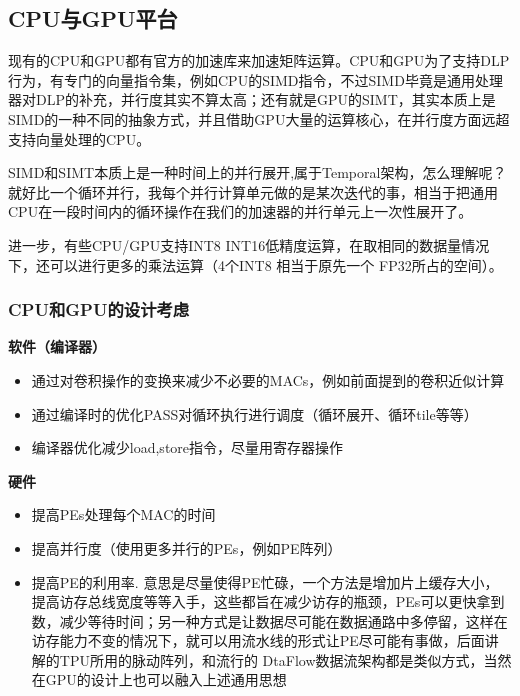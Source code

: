 \documentclass[12pt]{article}
\begin{document}
\subsection{CPU与GPU平台}
现有的CPU和GPU都有官方的加速库来加速矩阵运算。CPU和GPU为了支持DLP行为，有专门的向量指令集，例如CPU的SIMD指令，不过SIMD毕竟是通用处理器对DLP的补充，并行度其实不算太高；还有就是GPU的SIMT，其实本质上是SIMD的一种不同的抽象方式，并且借助GPU大量的运算核心，在并行度方面远超支持向量处理的CPU。

SIMD和SIMT本质上是一种时间上的并行展开,属于Temporal架构，怎么理解呢？就好比一个循环并行，我每个并行计算单元做的是某次迭代的事，相当于把通用CPU在一段时间内的循环操作在我们的加速器的并行单元上一次性展开了。

进一步，有些CPU/GPU支持INT8 INT16低精度运算，在取相同的数据量情况下，还可以进行更多的乘法运算（4个INT8 相当于原先一个 FP32所占的空间）。

\subsubsection{CPU和GPU的设计考虑}
\textbf{软件（编译器）}

\begin{itemize}
\setlength{\itemsep}{0pt}
\setlength{\parsep}{0pt}
\setlength{\parskip}{0pt}
    \item 通过对卷积操作的变换来减少不必要的MACs，例如前面提到的卷积近似计算
    \item 通过编译时的优化PASS对循环执行进行调度（循环展开、循环tile等等）
    \item 编译器优化减少load,store指令，尽量用寄存器操作
\end{itemize}

\textbf{硬件}

\begin{itemize}
\setlength{\itemsep}{0pt}
\setlength{\parsep}{0pt}
\setlength{\parskip}{0pt}
    \item 提高PEs处理每个MAC的时间
    \item 提高并行度（使用更多并行的PEs，例如PE阵列）
    \item 提高PE的利用率. 意思是尽量使得PE忙碌，一个方法是增加片上缓存大小，提高访存总线宽度等等入手，这些都旨在减少访存的瓶颈，PEs可以更快拿到数，减少等待时间；另一种方式是让数据尽可能在数据通路中多停留，这样在访存能力不变的情况下，就可以用流水线的形式让PE尽可能有事做，后面讲解的TPU所用的脉动阵列，和流行的 DtaFlow数据流架构都是类似方式，当然在GPU的设计上也可以融入上述通用思想
\end{itemize}
\end{document}
